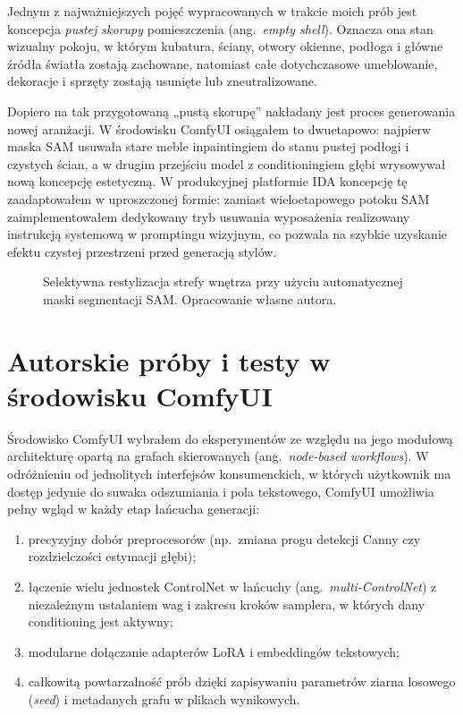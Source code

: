 Jednym z najważniejszych pojęć wypracowanych w trakcie moich prób jest koncepcja \emph{pustej skorupy} pomieszczenia (ang.\ \emph{empty shell}). Oznacza ona stan wizualny pokoju, w którym kubatura, ściany, otwory okienne, podłoga i główne źródła światła zostają zachowane, natomiast całe dotychczasowe umeblowanie, dekoracje i sprzęty zostają usunięte lub zneutralizowane.

Dopiero na tak przygotowaną „pustą skorupę” nakładany jest proces generowania nowej aranżacji. W środowisku ComfyUI osiągałem to dwuetapowo: najpierw maska SAM usuwała stare meble inpaintingiem do stanu pustej podłogi i czystych ścian, a w drugim przejściu model z conditioningiem głębi wrysowywał nową koncepcję estetyczną.
W produkcyjnej platformie IDA koncepcję tę zaadaptowałem w uproszczonej formie: zamiast wieloetapowego potoku SAM zaimplementowałem dedykowany tryb usuwania wyposażenia realizowany instrukcją systemową w promptingu wizyjnym, co pozwala na szybkie uzyskanie efektu czystej przestrzeni przed generacją stylów.

\begin{figure}[htbp]
  \centering
  \caption{Selektywna restylizacja strefy wnętrza przy użyciu automatycznej maski segmentacji SAM.
  Opracowanie własne autora.}
  \label{fig:ch04:sam}
\end{figure}

\section{Autorskie próby i testy w środowisku ComfyUI}
\label{ch04:sec:comfyui-proby}

Środowisko ComfyUI wybrałem do eksperymentów ze względu na jego modułową architekturę opartą na grafach skierowanych (ang.\ \emph{node-based workflows}). W odróżnieniu od jednolitych interfejsów konsumenckich, w których użytkownik ma dostęp jedynie do suwaka odszumiania i pola tekstowego, ComfyUI umożliwia pełny wgląd w każdy etap łańcucha generacji:
\begin{enumerate}
  \item precyzyjny dobór preprocesorów (np.\ zmiana progu detekcji Canny czy rozdzielczości estymacji głębi);
  \item łączenie wielu jednostek ControlNet w łańcuchy (ang.\ \emph{multi-ControlNet}) z niezależnym ustalaniem wag i zakresu kroków samplera, w których dany conditioning jest aktywny;
  \item modularne dołączanie adapterów LoRA i embeddingów tekstowych;
  \item całkowitą powtarzalność prób dzięki zapisywaniu parametrów ziarna losowego (\emph{seed}) i metadanych grafu w plikach wynikowych.
\end{enumerate}

